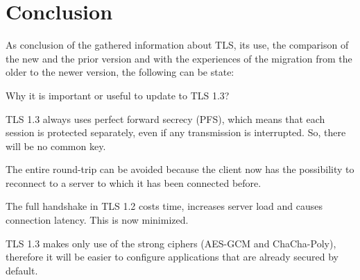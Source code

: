 \chapter{Conclusion}
\label{chap:conclusion}

As conclusion of the gathered information about TLS, its use, the comparison of the new and the prior version and with the experiences of the migration from the older to the newer version, the following can be state:

Why it is important or useful to update to TLS 1.3?

TLS 1.3 always uses perfect forward secrecy (PFS), which means that each session is protected separately, even if any transmission is interrupted. So, there will be no common key. 

The entire round-trip can be avoided because the client now has the possibility to reconnect to a server to which it has been connected before.

The full handshake in TLS 1.2 costs time, increases server load and causes connection latency. This is now minimized.

TLS 1.3 makes only use of the strong ciphers (AES-GCM and ChaCha-Poly), therefore it will be easier to configure applications that are already secured by default.

